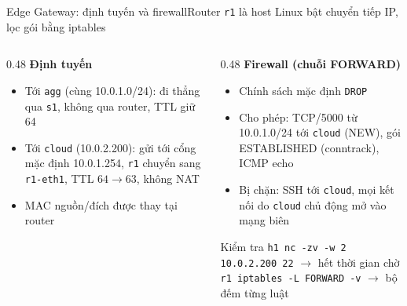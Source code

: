\documentclass[aspectratio=169,10pt]{beamer}
\begin{document}
\begin{frame}{Edge Gateway: định tuyến và firewall}{Router \texttt{r1} là host Linux bật chuyển tiếp IP, lọc gói bằng iptables}
  \begin{columns}[T]
    \begin{column}{0.48\textwidth}
      \small
      \textbf{Định tuyến}
      \begin{itemize}
        \item Tới \texttt{agg} (cùng 10.0.1.0/24): đi thẳng qua \texttt{s1}, không qua router, TTL giữ 64
        \item Tới \texttt{cloud} (10.0.2.200): gửi tới cổng mặc định 10.0.1.254, \texttt{r1} chuyển sang \texttt{r1-eth1}, TTL $64 \to 63$, không NAT
        \item MAC nguồn/đích được thay tại router
      \end{itemize}
    \end{column}
    \begin{column}{0.48\textwidth}
      \small
      \textbf{Firewall (chuỗi FORWARD)}
      \begin{itemize}
        \item Chính sách mặc định \texttt{DROP}
        \item Cho phép: TCP/5000 từ 10.0.1.0/24 tới \texttt{cloud} (NEW), gói ESTABLISHED (conntrack), ICMP echo
        \item Bị chặn: SSH tới \texttt{cloud}, mọi kết nối do \texttt{cloud} chủ động mở vào mạng biên
      \end{itemize}
      \begin{exampleblock}{Kiểm tra}
        \footnotesize\texttt{h1 nc -zv -w 2 10.0.2.200 22} $\to$ hết thời gian chờ\\
        \texttt{r1 iptables -L FORWARD -v} $\to$ bộ đếm từng luật
      \end{exampleblock}
    \end{column}
  \end{columns}
\end{frame}
\end{document}
